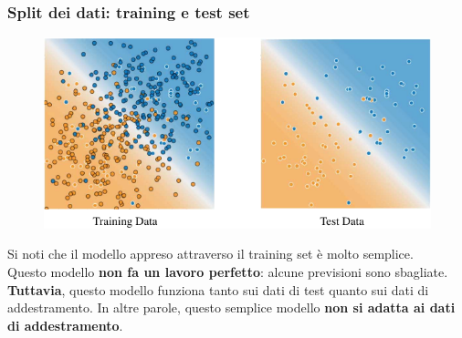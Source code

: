 \begin{frame}

	\frametitle{Split dei dati: training e test set}

	\begin{figure}[!htbp]
		\centering
		\includegraphics[width=0.8\linewidth]{images/supervised/validation_test_splitting_data/TrainingDataVsTestData.pdf}
	\end{figure}
	Si noti che il modello appreso attraverso il training set è molto semplice.\\
	Questo modello \textbf{non fa un lavoro perfetto}: alcune previsioni sono sbagliate.
	\textbf{Tuttavia}, questo modello funziona tanto sui dati di test quanto sui dati di addestramento. In altre parole, questo semplice modello \textbf{non si adatta ai dati di addestramento}.
\end{frame}


